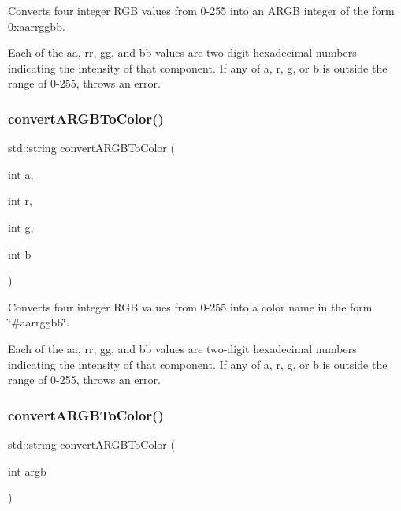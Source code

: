 Converts four integer R\+GB values from 0-\/255 into an A\+R\+GB integer of the form {\ttfamily 0xaarrggbb}. 

Each of the {\ttfamily aa}, {\ttfamily rr}, {\ttfamily gg}, and {\ttfamily bb} values are two-\/digit hexadecimal numbers indicating the intensity of that component. If any of a, r, g, or b is outside the range of 0-\/255, throws an error. \mbox{\label{classGColor_abc3a0188f264217b768e4a9a63fbc54e}} 
\subsubsection{\texorpdfstring{convert\+A\+R\+G\+B\+To\+Color()}{convertARGBToColor()}\hspace{0.1cm}{\footnotesize\ttfamily [1/2]}}
{\footnotesize\ttfamily std\+::string convert\+A\+R\+G\+B\+To\+Color (\begin{DoxyParamCaption}\item[{int}]{a,  }\item[{int}]{r,  }\item[{int}]{g,  }\item[{int}]{b }\end{DoxyParamCaption})\hspace{0.3cm}{\ttfamily [static]}}



Converts four integer R\+GB values from 0-\/255 into a color name in the form {\ttfamily \char`\"{}\#aarrggbb\char`\"{}}. 

Each of the {\ttfamily aa}, {\ttfamily rr}, {\ttfamily gg}, and {\ttfamily bb} values are two-\/digit hexadecimal numbers indicating the intensity of that component. If any of a, r, g, or b is outside the range of 0-\/255, throws an error. \mbox{\label{classGColor_aba032cfdc6b7936c6b828f8dfc2a9a90}} 
\subsubsection{\texorpdfstring{convert\+A\+R\+G\+B\+To\+Color()}{convertARGBToColor()}\hspace{0.1cm}{\footnotesize\ttfamily [2/2]}}
{\footnotesize\ttfamily std\+::string convert\+A\+R\+G\+B\+To\+Color (\begin{DoxyParamCaption}\item[{int}]{argb }\end{DoxyParamCaption})\hspace{0.3cm}{\ttfamily [static]}}



